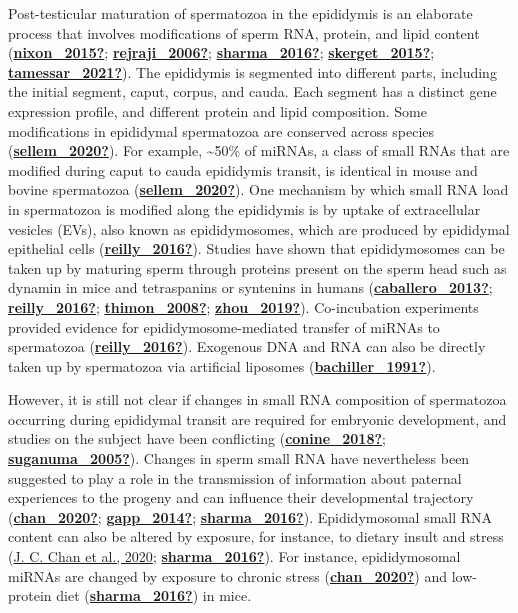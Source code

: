 \documentclass[12pt,twoside]{reedthesis}
\begin{document}
Post-testicular maturation of spermatozoa in the epididymis is an
elaborate process that involves modifications of sperm RNA, protein, and
lipid content (\protect\hyperlink{ref-nixon_2015}{\textbf{nixon\_2015?}}; \protect\hyperlink{ref-rejraji_2006}{\textbf{rejraji\_2006?}}; \protect\hyperlink{ref-sharma_2016}{\textbf{sharma\_2016?}}; \protect\hyperlink{ref-skerget_2015}{\textbf{skerget\_2015?}}; \protect\hyperlink{ref-tamessar_2021}{\textbf{tamessar\_2021?}}). The epididymis is segmented into different parts,
including the initial segment, caput, corpus, and cauda. Each segment
has a distinct gene expression profile, and different protein and lipid
composition. Some modifications in epididymal spermatozoa are conserved
across species (\protect\hyperlink{ref-sellem_2020}{\textbf{sellem\_2020?}}). For example, \textasciitilde50\% of miRNAs, a class of
small RNAs that are modified during caput to cauda epididymis transit,
is identical in mouse and bovine spermatozoa (\protect\hyperlink{ref-sellem_2020}{\textbf{sellem\_2020?}}). One
mechanism by which small RNA load in spermatozoa is modified along the
epididymis is by uptake of extracellular vesicles (EVs), also known as
epididymosomes, which are produced by epididymal epithelial cells
(\protect\hyperlink{ref-reilly_2016}{\textbf{reilly\_2016?}}). Studies have shown that epididymosomes can be taken up
by maturing sperm through proteins present on the sperm head such as
dynamin in mice and tetraspanins or syntenins in humans
(\protect\hyperlink{ref-caballero_2013}{\textbf{caballero\_2013?}}; \protect\hyperlink{ref-reilly_2016}{\textbf{reilly\_2016?}}; \protect\hyperlink{ref-thimon_2008}{\textbf{thimon\_2008?}}; \protect\hyperlink{ref-zhou_2019}{\textbf{zhou\_2019?}}). Co-incubation
experiments provided evidence for epididymosome-mediated transfer of
miRNAs to spermatozoa (\protect\hyperlink{ref-reilly_2016}{\textbf{reilly\_2016?}}). Exogenous DNA and RNA can also be
directly taken up by spermatozoa via artificial liposomes
(\protect\hyperlink{ref-bachiller_1991}{\textbf{bachiller\_1991?}}).

However, it is still not clear if changes in small RNA composition of
spermatozoa occurring during epididymal transit are required for
embryonic development, and studies on the subject have been conflicting
(\protect\hyperlink{ref-conine_2018}{\textbf{conine\_2018?}}; \protect\hyperlink{ref-suganuma_2005}{\textbf{suganuma\_2005?}}). Changes in sperm small RNA have
nevertheless been suggested to play a role in the transmission of
information about paternal experiences to the progeny and can influence
their developmental trajectory (\protect\hyperlink{ref-chan_2020}{\textbf{chan\_2020?}}; \protect\hyperlink{ref-gapp_2014}{\textbf{gapp\_2014?}}; \protect\hyperlink{ref-sharma_2016}{\textbf{sharma\_2016?}}).
Epididymosomal small RNA content can also be altered by exposure, for
instance, to dietary insult and stress (\protect\hyperlink{ref-chan2020}{J. C. Chan et al., 2020}; \protect\hyperlink{ref-sharma_2016}{\textbf{sharma\_2016?}}). For
instance, epididymosomal miRNAs are changed by exposure to chronic
stress (\protect\hyperlink{ref-chan_2020}{\textbf{chan\_2020?}}) and low-protein diet (\protect\hyperlink{ref-sharma_2016}{\textbf{sharma\_2016?}}) in mice.
\end{document}
